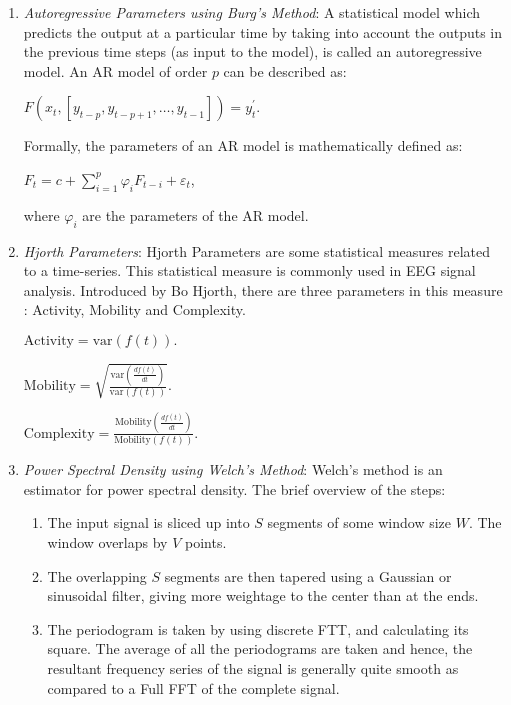 \begin{enumerate}
\item \emph{Autoregressive Parameters using Burg's Method}: A statistical model which predicts the output at a particular time by taking into account the outputs in the previous time steps (as input to the model), is called an autoregressive model. An AR model of order $p$ can be described as:
\begin{tightcenter}
$F(x_t, [y_{t - p}, y_{t - p + 1}, \ldots, y_{t - 1}]) = y_{t}^{\prime}$.
\end{tightcenter}
Formally, the parameters of an AR model is mathematically defined as:
\begin{tightcenter}
${F_{t}=c+\sum _{{i=1}}^{p}\varphi _{i}F_{{t-i}}+\varepsilon _{t}}$,
\end{tightcenter}
where $\varphi _{i}$ are the parameters of the AR model.
\item \emph{Hjorth Parameters}: Hjorth Parameters are some statistical measures related to a time-series. This statistical measure is commonly used in EEG signal analysis. Introduced by Bo Hjorth, there are three parameters in this measure : Activity, Mobility and Complexity.
\begin{tightcenter}
${\displaystyle {\text{Activity}}={\text{var}}(f(t)).}$
\end{tightcenter}
\begin{tightcenter}
${\displaystyle {\text{Mobility}}={\sqrt {\frac {{\text{var}}({\frac {df(t)}{dt}})}{{\text{var}}(f(t))}}}.}$
\end{tightcenter}
\begin{tightcenter}
${\displaystyle {\text{Complexity}}={\frac {{\text{Mobility}}({\frac {df(t)}{dt}})}{{\text{Mobility}}(f(t))}}.}$
\end{tightcenter}
\item \emph{Power Spectral Density using Welch's Method}: Welch's method is an estimator for power spectral density. The brief overview of the steps: 
\begin{enumerate}
    \item The input signal is sliced up into $S$ segments of some window size $W$. The window overlaps by $V$ points.
    \item The overlapping $S$ segments are then tapered using a Gaussian or sinusoidal filter, giving more weightage to the center than at the ends.
    \item The periodogram is taken by using discrete FTT, and calculating its square. The average of all the periodograms are taken and hence, the resultant frequency series of the signal is generally quite smooth as compared to a Full FFT of the complete signal.
\end{enumerate}


\end{enumerate}
